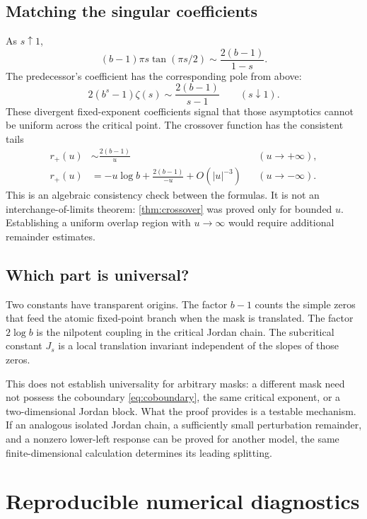 \documentclass[11pt,a4paper]{article}
\numberwithin{equation}{section}
\theoremstyle{definition}
\theoremstyle{remark}
\begin{document}
\subsection{Matching the singular coefficients}
As $s\uparrow1$,
\begin{equation}
 (b-1)\pi s\tan(\pi s/2)\sim\frac{2(b-1)}{1-s}.
 \label{eq:subcritical-divergence}
\end{equation}
The predecessor's coefficient has the corresponding pole from above:
\begin{equation}
 2(b^s-1)\zeta(s)\sim\frac{2(b-1)}{s-1}
 \qquad(s\downarrow1).
 \label{eq:supercritical-divergence}
\end{equation}
These divergent fixed-exponent coefficients signal that those
asymptotics cannot be uniform across the critical point.
The crossover function has the consistent tails
\begin{align}
 r_+(u)&\sim\frac{2(b-1)}{u}&& (u\to+\infty),\\
 r_+(u)&=-u\log b+\frac{2(b-1)}{-u}+O(|u|^{-3})
 &&(u\to-\infty).
 \label{eq:matching}
\end{align}
This is an algebraic consistency check between the formulas. It is not
an interchange-of-limits theorem: \cref{thm:crossover} was proved only
for bounded $u$. Establishing a uniform overlap region with $u\to\infty$
would require additional remainder estimates.

\subsection{Which part is universal?}
Two constants have transparent origins. The factor $b-1$ counts the
simple zeros that feed the atomic fixed-point branch when the mask is
translated. The factor $2\log b$ is the nilpotent coupling in the
critical Jordan chain. The subcritical constant $J_s$ is a local
translation invariant independent of the slopes of those zeros.

This does not establish universality for arbitrary masks: a different
mask need not possess the coboundary \cref{eq:coboundary}, the same
critical exponent, or a two-dimensional Jordan block. What the proof
provides is a testable mechanism. If an analogous isolated Jordan chain,
a sufficiently small perturbation remainder, and a nonzero lower-left
response can be proved for another model, the same finite-dimensional
calculation determines its leading splitting.

\section{Reproducible numerical diagnostics}
\label{sec:verification}
\end{document}
